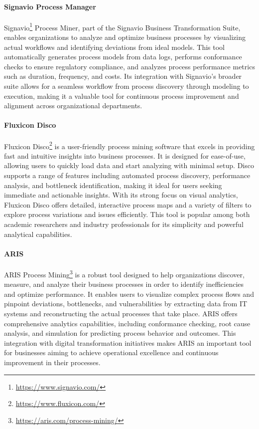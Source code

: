 \paragraph*{Signavio Process Manager}
Signavio\footnote{\url{https://www.signavio.com/}} Process Miner, part of the Signavio Business Transformation Suite, enables organizations to analyze and optimize business processes by visualizing actual workflows and identifying deviations from ideal models. This tool automatically generates process models from data logs, performs conformance checks to ensure regulatory compliance, and analyzes process performance metrics such as duration, frequency, and costs. Its integration with Signavio's broader suite allows for a seamless workflow from process discovery through modeling to execution, making it a valuable tool for continuous process improvement and alignment across organizational departments.

\paragraph*{Fluxicon Disco}
Fluxicon Disco\footnote{\url{https://www.fluxicon.com/}} is a user-friendly process mining software that excels in providing fast and intuitive insights into business processes. It is designed for ease-of-use, allowing users to quickly load data and start analyzing with minimal setup. Disco supports a range of features including automated process discovery, performance analysis, and bottleneck identification, making it ideal for users seeking immediate and actionable insights. With its strong focus on visual analytics, Fluxicon Disco offers detailed, interactive process maps and a variety of filters to explore process variations and issues efficiently. This tool is popular among both academic researchers and industry professionals for its simplicity and powerful analytical capabilities.

\paragraph*{ARIS}
ARIS Process Mining\footnote{\url{https://aris.com/process-mining/}} is a robust tool designed to help organizations discover, measure, and analyze their business processes in order to identify inefficiencies and optimize performance. It enables users to visualize complex process flows and pinpoint deviations, bottlenecks, and vulnerabilities by extracting data from IT systems and reconstructing the actual processes that take place. ARIS offers comprehensive analytics capabilities, including conformance checking, root cause analysis, and simulation for predicting process behavior and outcomes. This integration with digital transformation initiatives makes ARIS an important tool for businesses aiming to achieve operational excellence and continuous improvement in their processes.

